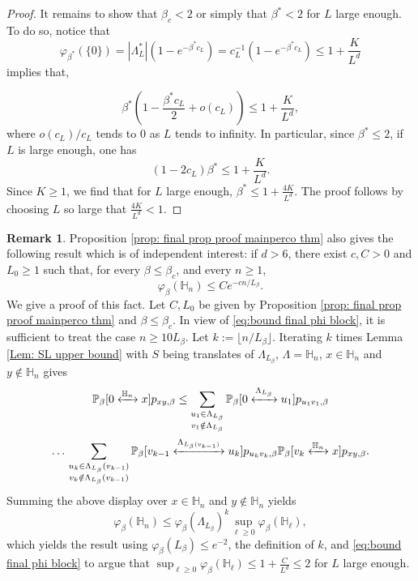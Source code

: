 \documentclass[11pt,a4paper]{article}
\numberwithin{equation}{section}
\theoremstyle{plain}
\theoremstyle{definition}
\newtheorem{Rem}[Thm]{Remark}
\newcommand{\connect}{\xleftrightarrow}
\begin{document}
\begin{proof}
It remains to show that $\beta_c<2$ or simply that $\beta^*<2$ for $L$ large enough. To do so, notice that 
\begin{equation}\varphi_{\beta^*}(\{0\})=|\Lambda_L^*|(1-e^{-\beta^*c_L})=c_L^{-1}(1-e^{-\beta^*c_L})\le 1+\frac{K}{L^d}
\end{equation} 
implies that,

\begin{equation}
	\beta^*(1-\frac{\beta^*c_L}{2}+o(c_L))\leq 1+\frac{K}{L^d},
\end{equation}
where $o(c_L)/c_L$ tends to $0$ as $L$ tends to infinity.  In particular, since $\beta^*\leq 2$, if $L$ is large enough, one has
\begin{equation}
	(1-2c_L)\beta^*\leq 1+\frac{K}{L^d}.
\end{equation}
Since $K\geq 1$, we find that for $L$ large enough, $\beta^*\leq 1+\tfrac{4K}{L^d}$. The proof follows by choosing $L$ so large that $\tfrac{4K}{L^d}<1$.
\end{proof}

\begin{Rem} Proposition \ref{prop: final prop proof mainperco thm} also gives the following result which is of independent interest: if $d>6$, there exist $c,C>0$ and $L_0\geq 1$ such that, for every $\beta\leq \beta_c$, and every $n\geq 1$,
\begin{equation}
	\varphi_\beta(\mathbb H_n)\leq Ce^{-cn/L_\beta}.
\end{equation}
We give a proof of this fact. Let $C,L_0$ be given by Proposition \ref{prop: final prop proof mainperco thm} and $\beta\leq \beta_c$. In view of \eqref{eq:bound final phi block}, it is sufficient to treat the case $n\geq 10L_\beta$. Let $k:=\lfloor n/L_\beta\rfloor$. Iterating $k$ times Lemma \eqref{Lem: SL upper bound} with $S$ being translates of $\Lambda_{L_\beta}$, $\Lambda=\mathbb H_n$, $x\in \mathbb H_n$ and $y\notin \mathbb H_n$ gives
\begin{multline}
	\mathbb P_\beta[0\connect{\mathbb H_n\:}x]p_{xy,\beta}\leq \sum_{\substack{u_1\in \Lambda_{L_\beta}\\v_1\notin \Lambda_{L_\beta}}}\mathbb P_\beta[0\connect{\Lambda_{L_\beta}\:}u_1]p_{u_1v_1,\beta}\\\ldots\sum_{\substack{u_k\in \Lambda_{L_\beta}(v_{k-1})\\v_k\notin \Lambda_{L_\beta}(v_{k-1})}}\mathbb P_\beta[v_{k-1}\connect{\Lambda_{L_\beta(v_{k-1})}\:}u_k]p_{u_kv_k,\beta} \mathbb P_\beta[v_k\connect{\mathbb H_n\:}x]p_{xy,\beta}.
	\end{multline}
	Summing the above display over $x\in \mathbb H_n$ and $y\notin \mathbb H_n$ yields
\begin{equation}
	\varphi_\beta(\mathbb H_n)\leq \varphi_\beta(\Lambda_{L_\beta})^k \sup_{\ell\geq 0}\varphi_\beta(\mathbb H_\ell),
\end{equation}
which yields the result using $\varphi_\beta(L_\beta)\leq e^{-2}$, the definition of $k$, and \eqref{eq:bound final phi block} to argue that $\sup_{\ell\geq 0}\varphi_\beta(\mathbb H_\ell)\leq 1+\frac{C}{L^d}\leq 2$ for $L$ large enough.
\end{Rem}
\end{document}
